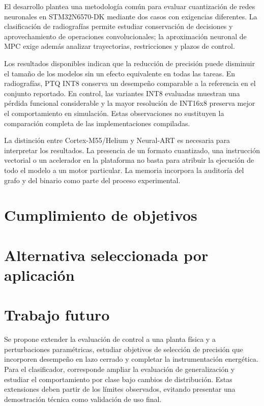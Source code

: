 El desarrollo plantea una metodología común para evaluar cuantización de redes neuronales en STM32N6570-DK mediante dos casos con exigencias diferentes. La clasificación de radiografías permite estudiar conservación de decisiones y aprovechamiento de operaciones convolucionales; la aproximación neuronal de MPC exige además analizar trayectorias, restricciones y plazos de control.

Los resultados disponibles indican que la reducción de precisión puede disminuir el tamaño de los modelos sin un efecto equivalente en todas las tareas. En radiografías, PTQ INT8 conserva un desempeño comparable a la referencia en el conjunto reportado. En control, las variantes INT8 evaluadas muestran una pérdida funcional considerable y la mayor resolución de INT16x8 preserva mejor el comportamiento en simulación. Estas observaciones no sustituyen la comparación completa de las implementaciones compiladas.

La distinción entre Cortex-M55/Helium y Neural-ART es necesaria para interpretar los resultados. La presencia de un formato cuantizado, una instrucción vectorial o un acelerador en la plataforma no basta para atribuir la ejecución de todo el modelo a un motor particular. La memoria incorpora la auditoría del grafo y del binario como parte del proceso experimental.

\section*{Cumplimiento de objetivos}
\section*{Alternativa seleccionada por aplicación}
\section*{Trabajo futuro}
Se propone extender la evaluación de control a una planta física y a perturbaciones paramétricas, estudiar objetivos de selección de precisión que incorporen desempeño en lazo cerrado y completar la instrumentación energética. Para el clasificador, corresponde ampliar la evaluación de generalización y estudiar el comportamiento por clase bajo cambios de distribución. Estas extensiones deben partir de los límites observados, evitando presentar una demostración técnica como validación de uso final.
